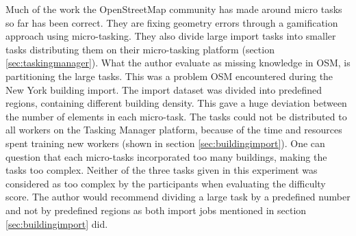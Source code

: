 Much of the work the OpenStreetMap community has made around micro tasks so far has been correct. They are fixing geometry errors through a gamification approach using micro-tasking. They also divide large import tasks into smaller tasks distributing them on their micro-tasking platform (section \ref{sec:taskingmanager}). What the author evaluate as missing knowledge in OSM, is partitioning the large tasks. This was a problem OSM encountered during the New York building import. The import dataset was divided into predefined regions, containing different building density. This gave a huge deviation between the number of elements in each micro-task. The tasks could not be distributed to all workers on the Tasking Manager platform, because of the time and resources spent training new workers (shown in section \ref{sec:buildingimport}). One can question that each micro-tasks incorporated too many buildings, making the tasks too complex. Neither of the three tasks given in this experiment was considered as too complex by the participants when evaluating the difficulty score. The author would recommend dividing a large task by a predefined number and not by predefined regions as both import jobs mentioned in section \ref{sec:buildingimport} did.



